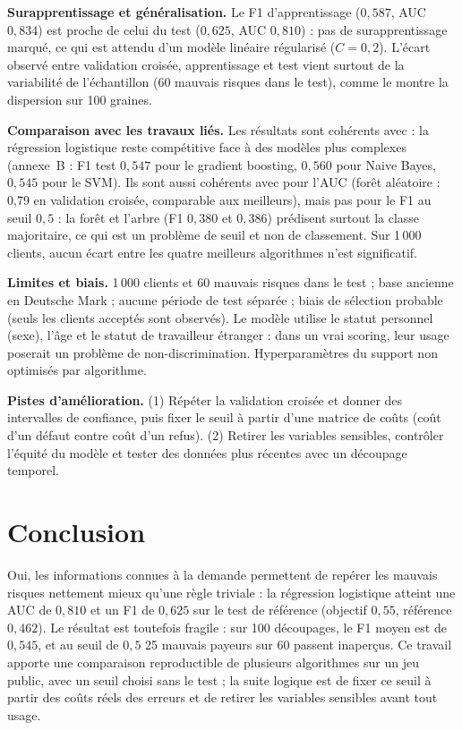 \documentclass[12pt,a4paper]{article}
\begin{document}
\textbf{Surapprentissage et généralisation.} Le F1 d’apprentissage ($0{,}587$, AUC $0{,}834$) est proche de celui du test ($0{,}625$, AUC $0{,}810$) : pas de surapprentissage marqué, ce qui est attendu d’un modèle linéaire régularisé ($C=0{,}2$). L’écart observé entre validation croisée, apprentissage et test vient surtout de la variabilité de l’échantillon (60 mauvais risques dans le test), comme le montre la dispersion sur 100 graines.

\textbf{Comparaison avec les travaux liés.} Les résultats sont cohérents avec \cite{baesens} : la régression logistique reste compétitive face à des modèles plus complexes (annexe~B : F1 test $0{,}547$ pour le gradient boosting, $0{,}560$ pour Naive Bayes, $0{,}545$ pour le SVM). Ils sont aussi cohérents avec \cite{brown} pour l’AUC (forêt aléatoire : 0{,}79 en validation croisée, comparable aux meilleurs), mais pas pour le F1 au seuil $0{,}5$ : la forêt et l’arbre (F1 $0{,}380$ et $0{,}386$) prédisent surtout la classe majoritaire, ce qui est un problème de seuil et non de classement. Sur 1\,000 clients, aucun écart entre les quatre meilleurs algorithmes n’est significatif.

\textbf{Limites et biais.} 1\,000 clients et 60 mauvais risques dans le test ; base ancienne en Deutsche Mark ; aucune période de test séparée ; biais de sélection probable (seuls les clients acceptés sont observés). Le modèle utilise le statut personnel (sexe), l’âge et le statut de travailleur étranger : dans un vrai scoring, leur usage poserait un problème de non-discrimination. Hyperparamètres du support non optimisés par algorithme.

\textbf{Pistes d’amélioration.} (1) Répéter la validation croisée et donner des intervalles de confiance, puis fixer le seuil à partir d’une matrice de coûts (coût d’un défaut contre coût d’un refus). (2) Retirer les variables sensibles, contrôler l’équité du modèle et tester des données plus récentes avec un découpage temporel.

\section{Conclusion}\label{sec:concl}
Oui, les informations connues à la demande permettent de repérer les mauvais risques nettement mieux qu’une règle triviale : la régression logistique atteint une AUC de $0{,}810$ et un F1 de $0{,}625$ sur le test de référence (objectif $0{,}55$, référence $0{,}462$). Le résultat est toutefois fragile : sur 100 découpages, le F1 moyen est de $0{,}545$, et au seuil de $0{,}5$ 25 mauvais payeurs sur 60 passent inaperçus. Ce travail apporte une comparaison reproductible de plusieurs algorithmes sur un jeu public, avec un seuil choisi sans le test ; la suite logique est de fixer ce seuil à partir des coûts réels des erreurs et de retirer les variables sensibles avant tout usage.
\end{document}
